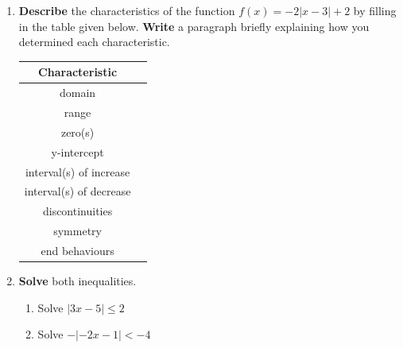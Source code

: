 \documentclass[12pt]{book}
\begin{document}

\begin{enumerate}

\item  \textbf{Describe} the characteristics of the function $f(x) = -2|x-3|+2$ by filling in the table given below. \textbf{Write} a paragraph briefly explaining how you determined each characteristic.\\

\vspace{2.5in}

\renewcommand{\arraystretch}{3}  %
\begin{center}

\begin{tabular}{|c|m{4in}|}
\hline
\textbf{Characteristic} &  \\
\hline
domain & \\
\hline
range & \\
\hline
zero(s) & \\
\hline
y-intercept & \\
\hline
interval(s) of increase & \\
\hline
interval(s) of decrease & \\
\hline
discontinuities & \\
\hline
symmetry & \\
\hline
end behaviours & \\
\hline
\end{tabular}
\end{center}



\newpage

\item \textbf{Solve} both inequalities.

\begin{enumerate}
\item Solve $|3x-5| \le 2$
\item Solve $-|-2x-1| < -4$
\end{enumerate}

\newpage


\end{enumerate}
\end{document}
